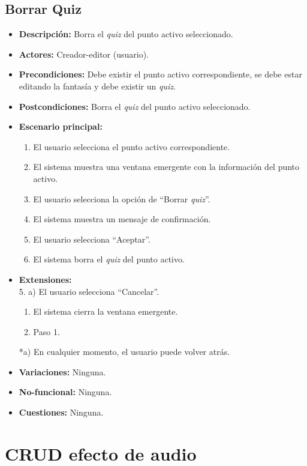 \documentclass[12pt,letterpaper]{article}
\begin{document}
\subsection{Borrar Quiz}
\begin{itemize}
	\item \textbf{Descripción:} Borra el \textit{quiz} del punto activo seleccionado.
	\item \textbf{Actores:} Creador-editor (usuario).
	\item \textbf{Precondiciones:} Debe existir el punto activo correspondiente, se debe estar editando la fantasía y debe existir un \textit{quiz}.
	\item \textbf{Postcondiciones:} Borra el \textit{quiz} del punto activo seleccionado.
	\item \textbf{Escenario principal:}
	\begin{enumerate}
		\item El usuario selecciona el punto activo correspondiente.
		\item El sistema muestra una ventana emergente con la información del punto activo.
		\item El usuario selecciona la opción de ``Borrar \textit{quiz}''.
		\item El sistema muestra un mensaje de confirmación.
		\item El usuario selecciona ``Aceptar''.
		\item El sistema borra el \textit{quiz} del punto activo.
	\end{enumerate}
	\item \textbf{Extensiones:} \\ 5. a) El usuario selecciona ``Cancelar''.
	\begin{enumerate}
		\item El sistema cierra la ventana emergente.
		\item Paso 1.
	\end{enumerate}
	*a) En cualquier momento, el usuario puede volver atrás.
	\item \textbf{Variaciones:} Ninguna.
	\item \textbf{No-funcional:} Ninguna.
	\item \textbf{Cuestiones:} Ninguna.
\end{itemize}

\section{CRUD efecto de audio}
\hypertarget{crearaudio}{}
\end{document}
